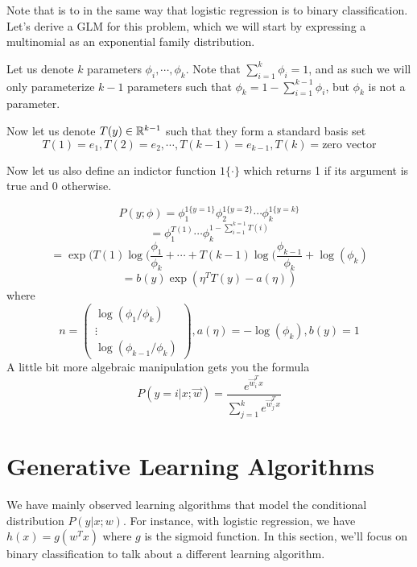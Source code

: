 \documentclass[12pt]{scrartcl}
\begin{document}
\begin{definition}
    Note that  is to  in the same way that logistic regression is to binary classification. Let's derive a GLM for this problem, which we will start by expressing a multinomial as an exponential family distribution.

\end{definition}

Let us denote $k$ parameters $\phi_i, \cdots, \phi_k$. Note that $\sum_{i=1}^k
    \phi_i = 1$, and as such we will only parameterize $k-1$ parameters such that
$\phi_k = 1 - \sum_{i=1}^{k-1}\phi_i$, but $\phi_k$ is not a parameter.

Now let us denote $T(y) \in \mathbb R^{k-1}$ such that they form a standard basis set
\[T(1) = e_1, T(2) = e_2, \cdots ,T(k-1) = e_{k-1}, T(k) = \text{zero vector}\]

Now let us also define an indictor function $1\{\cdot\}$ which returns 1 if its
argument is true and 0 otherwise.

\[P(y; \phi) = \phi_1^{1\{y=1\}}\phi_2^{1\{y=2\}}\cdots\phi_k^{1\{y=k\}}\]
\[= \phi_1^{T(1)}\cdots\phi_k^{1-\sum_{i=1}^{k=1}T(i)}\]
\[= \exp(T(1)\log(\frac{\phi_1}{\phi_k} + \cdots + T(k-1)\log(\frac{\phi_{k-1}}{\phi_k} + \log(\phi_k)\]
\[= b(y)\exp(\eta^TT(y) - a(\eta))\]
where
\[n = \begin{pmatrix}
        \log(\phi_1/\phi_k) \\
        \vdots              \\
        \log(\phi_{k-1}/\phi_k)
    \end{pmatrix}, a(\eta) = -\log(\phi_k), b(y) = 1\]
A little bit more algebraic manipulation gets you the formula
\[P(y=i| x;\vec{w}) = \frac{e^{\vec{w}_i^Tx}}{\sum_{j=1}^k e^{\vec{w}_j^Tx}}\]

\section{Generative Learning Algorithms}

We have mainly observed learning algorithms that model the conditional
distribution $P(y | x; w)$. For instance, with logistic regression, we have
$h(x) = g(w^Tx)$ where $g$ is the sigmoid function. In this section, we'll
focus on binary classification to talk about a different learning algorithm.\\
\end{document}
